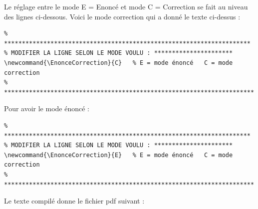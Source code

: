 \begin{dsxl}
 Le réglage entre le mode E = Enoncé et mode C = Correction se fait au niveau des lignes ci-dessous.
 Voici le mode correction qui a donné le texte ci-dessus : 
 \begin{verbatim}
% *********************************************************************
% MODIFIER LA LIGNE SELON LE MODE VOULU : **********************
\newcommand{\EnonceCorrection}{C}	% E = mode énoncé   C = mode correction 
% **********************************************************************
 \end{verbatim}

Pour avoir le mode énoncé : \\
 \begin{verbatim}
% *********************************************************************
% MODIFIER LA LIGNE SELON LE MODE VOULU : **********************
\newcommand{\EnonceCorrection}{E}	% E = mode énoncé   C = mode correction 
% **********************************************************************
 \end{verbatim}
Le texte compilé donne le fichier pdf suivant : 


\end{dsxl}
